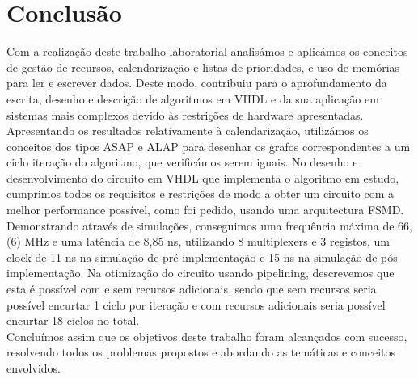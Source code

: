 \documentclass{article} %
\begin{document}
	\section{Conclusão}

		Com a realização deste trabalho laboratorial analisámos e aplicámos os conceitos de gestão de recursos, calendarização e listas de prioridades, e uso de memórias para ler e escrever dados. Deste modo, contribuiu para o aprofundamento da escrita, desenho e descrição de algoritmos em VHDL e da sua aplicação em sistemas mais complexos devido às restrições de hardware apresentadas.\\

		\noindent Apresentando os resultados relativamente à calendarização, utilizámos os conceitos dos tipos ASAP e ALAP para desenhar os grafos correspondentes a um ciclo iteração do algoritmo, que verificámos serem iguais. No desenho e desenvolvimento do circuito em VHDL que implementa o algoritmo em estudo, cumprimos todos os requisitos e restrições de modo a obter um circuito com a melhor performance possível, como foi pedido, usando uma arquitectura FSMD. Demonstrando através de simulações, conseguimos uma frequência máxima de 66,(6) MHz e uma latência de 8,85 ns, utilizando  8 multiplexers e 3 registos, um clock de 11 ns na simulação de pré implementação e 15 ns na simulação de pós implementação. Na otimização do circuito usando pipelining, descrevemos que esta é possível com e sem recursos adicionais, sendo que sem recursos seria possível encurtar 1 ciclo por iteração e com recursos adicionais seria possível encurtar 18 ciclos no total.\\

		\noindent Concluímos assim que os objetivos deste trabalho foram alcançados com sucesso, resolvendo todos os problemas propostos e abordando as temáticas e conceitos envolvidos.
	
\end{document}
